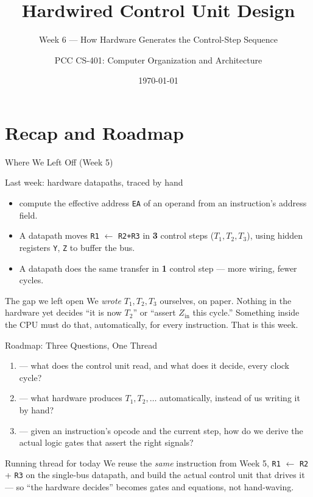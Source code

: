 \documentclass[aspectratio=169]{beamer}
\title{Hardwired Control Unit Design}
\subtitle{Week 6 --- How Hardware Generates the Control-Step Sequence}
\author{PCC CS-401: Computer Organization and Architecture}
\date{\today}
\begin{document}
\frame{\titlepage}

\section{Recap and Roadmap}

\begin{frame}{Where We Left Off (Week 5)}
  \begin{block}{Last week: hardware datapaths, traced by hand}
    \begin{itemize}
      \item {} compute the effective address \texttt{EA} of an
        operand from an instruction's address field.
      \item A  datapath moves \texttt{R1} $\gets$ \texttt{R2+R3} in
        \textbf{3} control steps ($T_1, T_2, T_3$), using hidden registers
        \texttt{Y}, \texttt{Z} to buffer the bus.
      \item A  datapath does the same transfer in \textbf{1} control
        step --- more wiring, fewer cycles.
    \end{itemize}
  \end{block}
  \vspace{0.3cm}
  \begin{exampleblock}{The gap we left open}
    We \emph{wrote} $T_1, T_2, T_3$ ourselves, on paper. Nothing in the hardware
    yet decides ``it is now $T_2$'' or ``assert $Z_{\text{in}}$ this cycle.'' Something
    inside the CPU must do that, automatically, for every instruction. That is
    this week.
  \end{exampleblock}
\end{frame}

\begin{frame}{Roadmap: Three Questions, One Thread}
  \begin{enumerate}
    \item {} --- what does the control unit read, and
      what does it decide, every clock cycle?
    \item {} --- what hardware produces
      $T_1, T_2, \dots$ automatically, instead of us writing it by hand?
    \item {} --- given an instruction's opcode and
      the current step, how do we derive the actual logic gates that assert the
      right signals?
    \end{enumerate}
  \vspace{0.4cm}
  \begin{alertblock}{Running thread for today}
    We reuse the \emph{same} instruction from Week 5, \texttt{R1} $\gets$
    \texttt{R2} + \texttt{R3} on the single-bus datapath, and build the actual
    control unit that drives it --- so ``the hardware decides'' becomes gates and
    equations, not hand-waving.
  \end{alertblock}
\end{frame}
\end{document}
